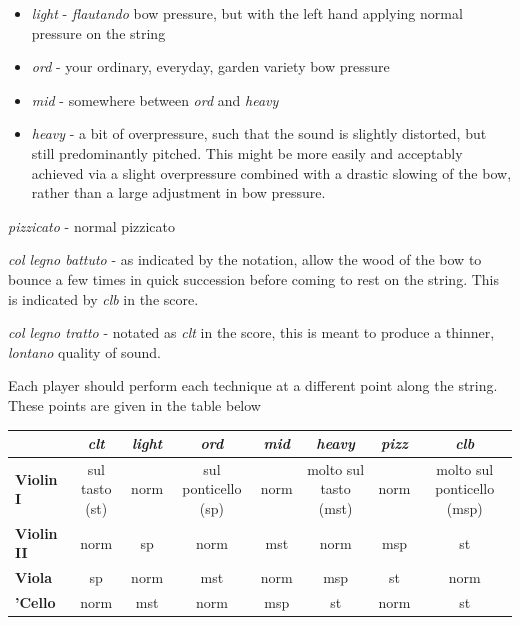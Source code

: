 \documentclass{article}
\begin{document}
\begin{itemize}
  \item \textit{light} - \textit{flautando} bow pressure, but with the left hand applying normal pressure on the string
  \item \textit{ord} - your ordinary, everyday, garden variety bow pressure
  \item \textit{mid} - somewhere between \textit{ord} and \textit{heavy}
  \item \textit{heavy} - a bit of overpressure, such that the sound is slightly distorted, but still predominantly pitched. This might be more easily and acceptably achieved via a slight overpressure combined with a drastic slowing of the bow, rather than a large adjustment in bow pressure.
\end{itemize}

\textit{pizzicato} - normal pizzicato

\textit{col legno battuto} -  as indicated by the notation, allow the wood of
the bow to bounce a few times in quick succession before coming to rest on
the string. This is indicated by \textit{clb} in the score.

\textit{col legno tratto} - notated as \textit{clt} in the score, this is
meant to produce a thinner, \textit{lontano} quality of sound.

Each player should perform each technique at a different point along the string.
These points are given in the table below

\begin{table}[h!]
  \begin{center}
    \label{tab:table1}
    \begin{tabular}{l|c|c|c|c|c|c|c} %
      \space              & \textit{clt}   & \textit{light} & \textit{ord}   & \textit{mid}  & \textit{heavy} & \textit{pizz}  & \textit{clb} \\
      \hline
      \textbf{Violin I}   & sul tasto (st)   & norm  & sul ponticello (sp)   & norm    & molto sul tasto (mst)  & norm  & molto sul ponticello (msp) \\
      \hline
      \textbf{Violin II}  & norm  & sp    & norm  & mst     & norm  & msp   & st  \\
      \hline
      \textbf{Viola}      & sp    & norm  & mst   & norm    & msp   & st    & norm \\
      \hline
      \textbf{'Cello}     & norm  & mst   & norm  & msp     & st    & norm  & st \\
      \hline
    \end{tabular}
  \end{center}
\end{table}
\end{document}
